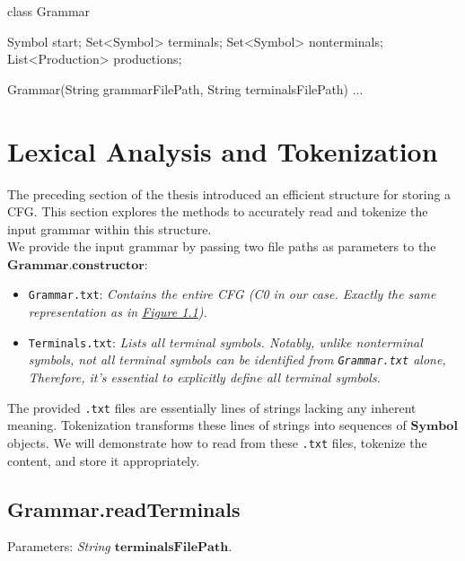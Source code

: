 \begin{codeblock}
    class Grammar {
        Symbol start;
        Set<Symbol> terminals;
        Set<Symbol> nonterminals;
        List<Production> productions;

        Grammar(String grammarFilePath, String terminalsFilePath) {}
        ...
    }
\end{codeblock}

\newpage


\section{Lexical Analysis and Tokenization}\label{sec:Lexical Analysis and Tokenization}

The preceding section of the thesis introduced an efficient structure for storing a CFG. This section explores the methods to accurately read and tokenize the input grammar within this structure.\\

We provide the input grammar by passing two file paths as parameters to the \(\boldsymbol{Grammar.constructor}\):
\begin{itemize}
    \item  \texttt{Grammar.txt}: \textit{Contains the entire CFG (C0 in our case. Exactly the same representation as in \hyperref[fig:grammar_c0]{Figure 1.1}).}
    \item  \texttt{Terminals.txt}: \textit{Lists all terminal symbols. Notably, unlike nonterminal symbols, not all terminal symbols can be identified from \texttt{Grammar.txt} alone, Therefore, it’s essential to explicitly define all terminal symbols.}
\end{itemize}

The provided \texttt{.txt} files are essentially lines of strings lacking any inherent meaning. Tokenization transforms these lines of strings into sequences of \(\boldsymbol{Symbol}\) objects. We will demonstrate how to read from these \texttt{.txt} files, tokenize the content, and store it appropriately.

\subsection{Grammar.readTerminals}

Parameters: \textit{String \(\boldsymbol{terminalsFilePath}\).}


